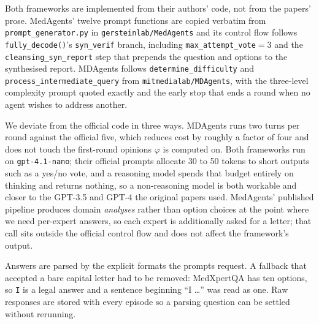 Both frameworks are implemented from their authors' code, not from the papers'
prose. MedAgents' twelve prompt functions are copied verbatim from
\texttt{prompt\_generator.py} in \texttt{gersteinlab/MedAgents} and its control flow
follows \texttt{fully\_decode()}'s \texttt{syn\_verif} branch, including
\texttt{max\_attempt\_vote}${=}3$ and the \texttt{cleansing\_syn\_report} step that
prepends the question and options to the synthesised report. MDAgents follows
\texttt{determine\_difficulty} and \texttt{process\_intermediate\_query} from
\texttt{mitmedialab/MDAgents}, with the three-level complexity prompt quoted exactly
and the early stop that ends a round when no agent wishes to address another.

We deviate from the official code in three ways. MDAgents runs two turns per round against the
official five, which reduces cost by roughly a factor of four and does not touch the
first-round opinions $\varphi$ is computed on. Both frameworks run on
\texttt{gpt-4.1-nano}; their official prompts allocate 30 to 50 tokens to short
outputs such as a yes/no vote, and a reasoning model spends that budget entirely on
thinking and returns nothing, so a non-reasoning model is both workable and closer to
the GPT-3.5 and GPT-4 the original papers used. MedAgents' published pipeline
produces domain \emph{analyses} rather than option choices at the point where we need
per-expert answers, so each expert is additionally asked for a letter; that call sits
outside the official control flow and does not affect the framework's output.

Answers are parsed by the explicit formats the prompts request. A fallback that
accepted a bare capital letter had to be removed: MedXpertQA has ten options, so
\texttt{I} is a legal answer and a sentence beginning ``I \ldots'' was read as one.
Raw responses are stored with every episode so a parsing question can be settled
without rerunning.

